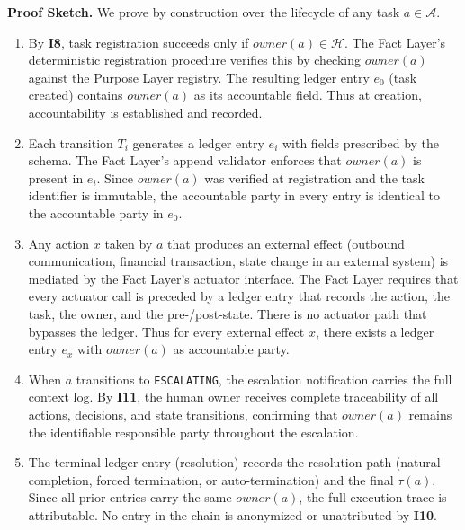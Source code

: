\bigskip
\noindent\textbf{Proof Sketch.} We prove by construction over the lifecycle of any task $a \in \mathcal{A}$.

\begin{enumerate}
\item[\textbf{Step 1 — Registration:} ] By \textbf{I8}, task registration succeeds only if $owner(a) \in \mathcal{H}$. The Fact Layer's deterministic registration procedure verifies this by checking $owner(a)$ against the Purpose Layer registry. The resulting ledger entry $e_0$ (task created) contains $owner(a)$ as its accountable field. Thus at creation, accountability is established and recorded.

\item[\textbf{Step 2 — State transitions:} ] Each transition $T_i$ generates a ledger entry $e_i$ with fields prescribed by the schema. The Fact Layer's append validator enforces that $owner(a)$ is present in $e_i$. Since $owner(a)$ was verified at registration and the task identifier is immutable, the accountable party in every entry is identical to the accountable party in $e_0$.

\item[\textbf{Step 3 — External actions:} ] Any action $x$ taken by $a$ that produces an external effect (outbound communication, financial transaction, state change in an external system) is mediated by the Fact Layer's actuator interface. The Fact Layer requires that every actuator call is preceded by a ledger entry that records the action, the task, the owner, and the pre-/post-state. There is no actuator path that bypasses the ledger. Thus for every external effect $x$, there exists a ledger entry $e_x$ with $owner(a)$ as accountable party.

\item[\textbf{Step 4 — Escalation path:} ] When $a$ transitions to \texttt{ESCALATING}, the escalation notification carries the full context log. By \textbf{I11}, the human owner receives complete traceability of all actions, decisions, and state transitions, confirming that $owner(a)$ remains the identifiable responsible party throughout the escalation.

\item[\textbf{Step 5 — Resolution and audit:} ] The terminal ledger entry (resolution) records the resolution path (natural completion, forced termination, or auto-termination) and the final $\tau(a)$. Since all prior entries carry the same $owner(a)$, the full execution trace is attributable. No entry in the chain is anonymized or unattributed by \textbf{I10}.
\end{enumerate}

